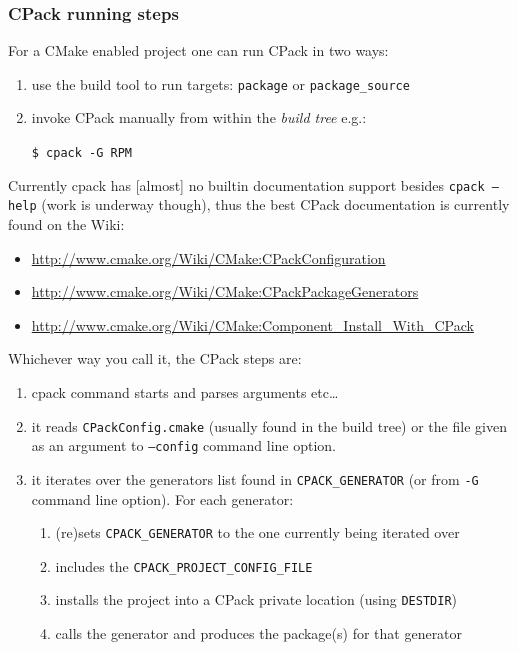\documentclass[compress,slidestop,table
              ]
               {beamer}
\newcommand{\fname}[1]{\texttt{#1}}
\begin{document}
\begin{frame}
\frametitle{CPack running steps}
For a CMake enabled project one can run CPack in two ways:
\begin{enumerate}
\item use the build tool to run targets: \fname{package} or \fname{package\_source}
\item invoke CPack manually from within the \emph{build tree} e.g.:

      \fname{\$ cpack -G RPM}
\end{enumerate}
Currently cpack has [almost] no builtin documentation support
besides \fname{cpack --help} (work is underway though), thus
the best CPack documentation is currently found on the Wiki:
\begin{itemize}
\item \url{http://www.cmake.org/Wiki/CMake:CPackConfiguration}
\item \url{http://www.cmake.org/Wiki/CMake:CPackPackageGenerators}
\item \url{http://www.cmake.org/Wiki/CMake:Component_Install_With_CPack}
\end{itemize}

Whichever way you call it, the CPack steps are:
\begin{enumerate}
\item cpack command starts and parses arguments etc\ldots
\item it reads \fname{CPackConfig.cmake} (usually found in the build tree)
      or the file given as an argument to \fname{--config} command line option.
\item it iterates over the generators list found in \fname{CPACK\_GENERATOR}
      (or from \fname{-G} command line option). For each generator:
      \begin{enumerate}
      \item (re)sets \fname{CPACK\_GENERATOR} to the one currently being iterated over
      \item includes the \fname{CPACK\_PROJECT\_CONFIG\_FILE}
      \item installs the project into a CPack private location (using \fname{DESTDIR})
      \item calls the generator and produces the package(s) for that generator
      \end{enumerate}
\end{enumerate}


\end{frame}
\end{document}
